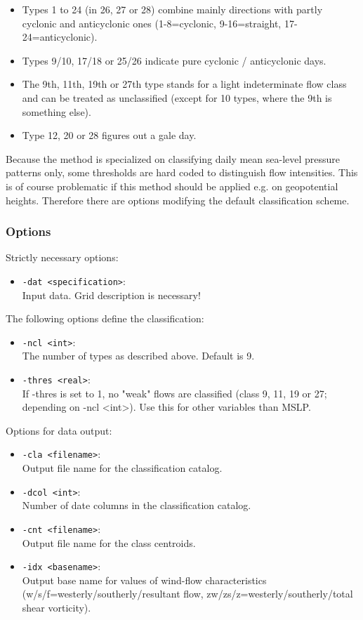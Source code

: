 \documentclass[12pt, oneside, a4paper, headsepline, plainheadsepline]{scrbook}
\begin{document}
\begin{enumerate}
\begin{itemize}
  \item Types 1 to 24 (in 26, 27 or 28) combine mainly directions with partly cyclonic and anticyclonic ones (1-8=cyclonic, 9-16=straight, 17-24=anticyclonic).
  \item Types 9/10, 17/18 or 25/26 indicate pure cyclonic / anticyclonic days.
  \item The 9th, 11th, 19th or 27th type stands for a light indeterminate flow class and can be treated as unclassified (except for 10 types, where the 9th is something else).
  \item Type 12, 20 or 28 figures out a gale day.
  \end{itemize}
\end{enumerate}

Because the method is specialized on classifying daily mean sea-level 
pressure patterns only, some thresholds are hard coded to distinguish 
flow intensities. This is of course problematic if this method should 
be applied e.g. on geopotential heights. Therefore there are options 
modifying the default classification scheme.  

\subsubsection*{Options}
Strictly necessary options:
\begin{itemize}
 \item \verb+-dat <specification>+:\\ Input data. Grid description is necessary!
\end{itemize}
The following options define the classification:
\begin{itemize}
 \item \verb+-ncl <int>+:\\ The number of types as described above. 
 Default is 9.
\item \verb+-thres <real>+:\\ If -thres is set to 1, no "weak" flows are 
classified (class 9, 11, 19 or 27; depending on -ncl <int>). Use this for other variables than MSLP. 
\end{itemize}
Options for data output:
\begin{itemize}
 \item \verb+-cla <filename>+:\\ Output file name for the classification catalog.
 \item \verb+-dcol <int>+:\\ Number of date columns in the classification catalog.
 \item \verb+-cnt <filename>+:\\ Output file name for the class centroids.
 \item \verb+-idx <basename>+:\\ Output base name for values of wind-flow 
 characteristics (w/s/f=westerly/southerly/resultant flow, zw/zs/z=westerly/southerly/total shear vorticity).
\end{itemize}
\end{document}
